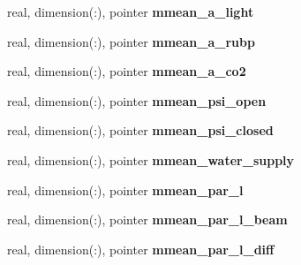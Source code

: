 \begin{DoxyCompactItemize}
\item 
\hypertarget{structed__state__vars_1_1edtype_aef2eba8c3739fe207985b0e85fcc0e30}{
real, dimension(:), pointer {\bfseries mmean\_\-a\_\-light}}
\label{structed__state__vars_1_1edtype_aef2eba8c3739fe207985b0e85fcc0e30}

\item 
\hypertarget{structed__state__vars_1_1edtype_a4fad6f0c2c459c0d3065931db1f7fe03}{
real, dimension(:), pointer {\bfseries mmean\_\-a\_\-rubp}}
\label{structed__state__vars_1_1edtype_a4fad6f0c2c459c0d3065931db1f7fe03}

\item 
\hypertarget{structed__state__vars_1_1edtype_af4239c67c1b3775ded6018907c8d1f88}{
real, dimension(:), pointer {\bfseries mmean\_\-a\_\-co2}}
\label{structed__state__vars_1_1edtype_af4239c67c1b3775ded6018907c8d1f88}

\item 
\hypertarget{structed__state__vars_1_1edtype_a67aac6cc5f111759557a439c91a330c1}{
real, dimension(:), pointer {\bfseries mmean\_\-psi\_\-open}}
\label{structed__state__vars_1_1edtype_a67aac6cc5f111759557a439c91a330c1}

\item 
\hypertarget{structed__state__vars_1_1edtype_af9edb2a9d063920d769fa928202aafb7}{
real, dimension(:), pointer {\bfseries mmean\_\-psi\_\-closed}}
\label{structed__state__vars_1_1edtype_af9edb2a9d063920d769fa928202aafb7}

\item 
\hypertarget{structed__state__vars_1_1edtype_a57c069a30a7b9f83f5aa662650a6a669}{
real, dimension(:), pointer {\bfseries mmean\_\-water\_\-supply}}
\label{structed__state__vars_1_1edtype_a57c069a30a7b9f83f5aa662650a6a669}

\item 
\hypertarget{structed__state__vars_1_1edtype_ae934e877fc6eb250163ca967d13cb531}{
real, dimension(:), pointer {\bfseries mmean\_\-par\_\-l}}
\label{structed__state__vars_1_1edtype_ae934e877fc6eb250163ca967d13cb531}

\item 
\hypertarget{structed__state__vars_1_1edtype_a496b7e37542b596e7de76d405657730a}{
real, dimension(:), pointer {\bfseries mmean\_\-par\_\-l\_\-beam}}
\label{structed__state__vars_1_1edtype_a496b7e37542b596e7de76d405657730a}

\item 
\hypertarget{structed__state__vars_1_1edtype_a409e49bad7947530df2cb7d4b47466e6}{
real, dimension(:), pointer {\bfseries mmean\_\-par\_\-l\_\-diff}}
\label{structed__state__vars_1_1edtype_a409e49bad7947530df2cb7d4b47466e6}


\end{DoxyCompactItemize}
